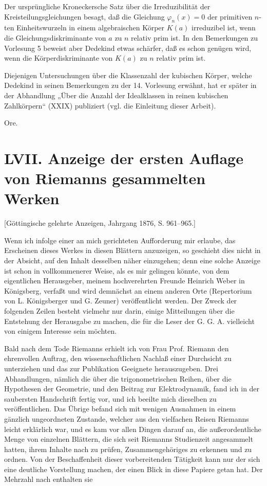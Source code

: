 \documentclass[11pt]{article}
\newcommand{\origpage}[1]{\par\vspace{0.25em}\noindent{\footnotesize\itshape [Gedruckte Seite #1]}\par\vspace{0.25em}}
\begin{document}
Der ursprüngliche Kroneckersche Satz über die Irreduzibilität der Kreisteilungsgleichungen besagt, daß die Gleichung $\varphi_n(x)=0$ der primitiven $n$-ten Einheitswurzeln in einem algebraischen Körper $K(a)$ irreduzibel ist, wenn die Gleichungsdiskriminante von $a$ zu $n$ relativ prim ist. In den Bemerkungen zu Vorlesung 5 beweist aber Dedekind etwas schärfer, daß es schon genügen wird, wenn die Körperdiskriminante von $K(a)$ zu $n$ relativ prim ist.

Diejenigen Untersuchungen über die Klassenzahl der kubischen Körper, welche Dedekind in seinen Bemerkungen zu der 14. Vorlesung erwähnt, hat er später in der Abhandlung „Über die Anzahl der Idealklassen in reinen kubischen Zahlkörpern“ (XXIX) publiziert (vgl. die Einleitung dieser Arbeit).

\begin{flushright}Ore.\end{flushright}

\origpage{421}
\section*{LVII. Anzeige der ersten Auflage von Riemanns gesammelten Werken}
\begin{center}\small [Göttingische gelehrte Anzeigen, Jahrgang 1876, S. 961--965.]\end{center}

Wenn ich infolge einer an mich gerichteten Aufforderung mir erlaube, das Erscheinen dieses Werkes in diesen Blättern anzuzeigen, so geschieht dies nicht in der Absicht, auf den Inhalt desselben näher einzugehen; denn eine solche Anzeige ist schon in vollkommenerer Weise, als es mir gelingen könnte, von dem eigentlichen Herausgeber, meinem hochverehrten Freunde Heinrich Weber in Königsberg, verfaßt und wird demnächst an einem anderen Orte (Repertorium von L. Königsberger und G. Zeuner) veröffentlicht werden. Der Zweck der folgenden Zeilen besteht vielmehr nur darin, einige Mitteilungen über die Entstehung der Herausgabe zu machen, die für die Leser der G. G. A. vielleicht von einigem Interesse sein möchten.

Bald nach dem Tode Riemanns erhielt ich von Frau Prof. Riemann den ehrenvollen Auftrag, den wissenschaftlichen Nachlaß einer Durchsicht zu unterziehen und das zur Publikation Geeignete herauszugeben. Drei Abhandlungen, nämlich die über die trigonometrischen Reihen, über die Hypothesen der Geometrie, und den Beitrag zur Elektrodynamik, fand ich in der saubersten Handschrift fertig vor, und ich beeilte mich dieselben zu veröffentlichen. Das Übrige befand sich mit wenigen Ausnahmen in einem gänzlich ungeordneten Zustande, welcher aus den vielfachen Reisen Riemanns leicht erklärlich war, und es kam vor allen Dingen darauf an, die außerordentliche Menge von einzelnen Blättern, die sich seit Riemanns Studienzeit angesammelt hatten, ihrem Inhalte nach zu prüfen, Zusammengehöriges zu erkennen und zu ordnen. Von der Beschaffenheit dieser vorbereitenden Tätigkeit kann nur der sich eine deutliche Vorstellung machen, der einen Blick in diese Papiere getan hat. Der Mehrzahl nach enthalten sie
\end{document}
